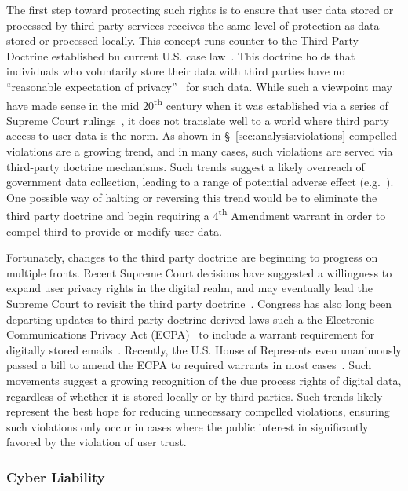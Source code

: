 The first step toward protecting such rights is to ensure that user
data stored or processed by third party services receives the same
level of protection as data stored or processed locally. This concept
runs counter to the Third Party Doctrine established bu current
U.S. case law~\cite{thompson-thirdparty}. This doctrine holds that
individuals who voluntarily store their data with third parties have
no ``reasonable expectation of privacy''~\cite{scotus-katzvus} for
such data. While such a viewpoint may have made sense in the mid
20\textsuperscript{th} century when it was established via a series of
Supreme Court rulings~\cite{scotus-usvmiller-privacy,
  scotus-smithvmaryland}, it does not translate well to a world where
third party access to user data is the norm. As shown in
\S~\ref{sec:analysis:violations} compelled violations are a growing
trend, and in many cases, such violations are served via third-party
doctrine mechanisms. Such trends suggest a likely overreach of
government data collection, leading to a range of potential adverse
effect (e.g.~\cite{penney2016}). One possible way of halting or
reversing this trend would be to eliminate the third party doctrine
and begin requiring a 4\textsuperscript{th} Amendment warrant in order
to compel third to provide or modify user data.

Fortunately, changes to the third party doctrine are beginning to
progress on multiple fronts. Recent Supreme Court decisions have
suggested a willingness to expand user privacy rights in the digital
realm, and may eventually lead the Supreme Court to revisit the third
party doctrine~\cite{scotus-usvjones}.  Congress has also long been
departing updates to third-party doctrine derived laws such a the
Electronic Communications Privacy Act (ECPA)~\cite{ecpa} to include a
warrant requirement for digitally stored
emails~\cite{eff-ecpareform}. Recently, the U.S. House of Represents
even unanimously passed a bill to amend the ECPA to required warrants
in most cases~\cite{trujillo-ecpa}. Such movements suggest a growing
recognition of the due process rights of digital data, regardless of
whether it is stored locally or by third parties. Such trends likely
represent the best hope for reducing unnecessary compelled violations,
ensuring such violations only occur in cases where the public interest
in significantly favored by the violation of user trust.

\subsubsection{Cyber Liability}


